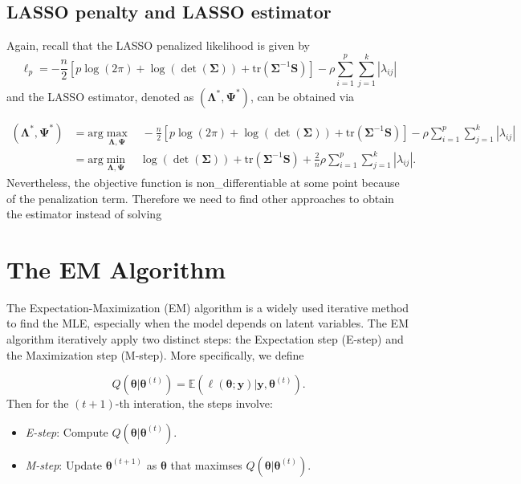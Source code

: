 \documentclass[
  a4paper,
  oneside,
  openany,
  12pt,
  onecolumn,
  twoside]{book}
\providecommand{\tightlist}{%
  \setlength{\itemsep}{0pt}\setlength{\parskip}{0pt}}\usepackage{longtable,booktabs,array}
\theoremstyle{plain}
\theoremstyle{remark}
\begin{document}
\subsection{LASSO penalty and LASSO
estimator}\label{lasso-penalty-and-lasso-estimator}

Again, recall that the LASSO penalized likelihood is given by
\[\ell_p=-\frac{n}{2}[p\log(2\pi)+\log(\det(\boldsymbol{\Sigma}))+\text{tr}(\boldsymbol{\Sigma}^{-1}\boldsymbol{S})]-\rho\sum^p_{i=1}\sum^k_{j=1}|\lambda_{ij}|\]
and the LASSO estimator, denoted as
\((\boldsymbol{\Lambda}^*,\boldsymbol{\Psi}^*)\), can be obtained via

\[
\begin{align*}
(\boldsymbol{\Lambda}^*,\boldsymbol{\Psi}^*) &= \text{arg}\max_{\boldsymbol{\Lambda},\boldsymbol{\Psi}} \quad -\frac{n}{2}[p\log(2\pi)+\log(\det(\boldsymbol{\Sigma}))+\text{tr}(\boldsymbol{\Sigma}^{-1}\boldsymbol{S})]-\rho\sum^p_{i=1}\sum^k_{j=1}|\lambda_{ij}|\\
&=\text{arg}\min_{\boldsymbol{\Lambda},\boldsymbol{\Psi}} \quad \log(\det(\boldsymbol{\Sigma}))+\text{tr}(\boldsymbol{\Sigma}^{-1}\boldsymbol{S})+\frac{2}{n}\rho\sum^p_{i=1}\sum^k_{j=1}|\lambda_{ij}|.
\end{align*}
\] Nevertheless, the objective function is non\_differentiable at some
point because of the penalization term. Therefore we need to find other
approaches to obtain the estimator instead of solving

\section{The EM Algorithm}\label{sec-EM}

The Expectation-Maximization (EM) algorithm is a widely used iterative
method to find the MLE, especially when the model depends on latent
variables. The EM algorithm iteratively apply two distinct steps: the
Expectation step (E-step) and the Maximization step (M-step). More
specifically, we define

\[Q(\boldsymbol{\theta}|\boldsymbol{\theta}^{(t)}) = \mathbb{E}\left(\ell (\boldsymbol{\theta}; \boldsymbol{y})\bigg|\boldsymbol{y},\boldsymbol{\theta}^{(t)}\right).\]
Then for the \((t + 1)\)-th interation, the steps involve:

\begin{itemize}
\tightlist
\item
  \emph{E-step}: Compute
  \(Q(\boldsymbol{\theta}|\boldsymbol{\theta}^{(t)})\).
\item
  \emph{M-step}: Update \(\boldsymbol{\theta}^{(t+1)}\) as
  \(\boldsymbol{\theta}\) that maximses
  \(Q(\boldsymbol{\theta}|\boldsymbol{\theta}^{(t)})\).
\end{itemize}
\end{document}
